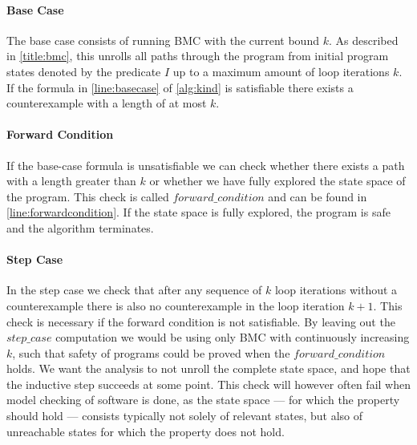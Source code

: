 \paragraph{Base Case}
The base case consists of running \ac{BMC} with the current bound $k$. As described in \autoref{title:bmc}, this unrolls all paths through
the program from initial program states denoted by the predicate $I$ up to a maximum amount of loop iterations $k$. If the formula in
\autoref{line:basecase} of \autoref{alg:kind} is satisfiable there exists a counterexample with a length of at most $k$.

\paragraph{Forward Condition}
If the base-case formula is unsatisfiable we can check whether there exists a path with a length greater than $k$ or whether we have fully
explored the state space of the program. This check is called $forward\_condition$ and can be found in \autoref{line:forwardcondition}.
If the state space is fully explored, the program is safe\, and the algorithm terminates.

\paragraph{Step Case}\label{title:kindstep}
In the step case we check that after any sequence of $k$ loop iterations without
a counterexample there is also no counterexample in the loop iteration $k+1$. This 
check is necessary if the forward condition is not satisfiable. By leaving out the $step\_case$
computation we would be using only \ac{BMC} with continuously increasing $k$, such that safety of
programs could be proved when the $forward\_condition$ holds. We want the analysis to not unroll
the complete state space, and hope that the inductive step succeeds at some point. This check will however often 
fail when model checking of software is done, as the state space --- for which the 
property should hold --- consists typically not solely of relevant states, but also of 
unreachable states for which the property does not hold.

